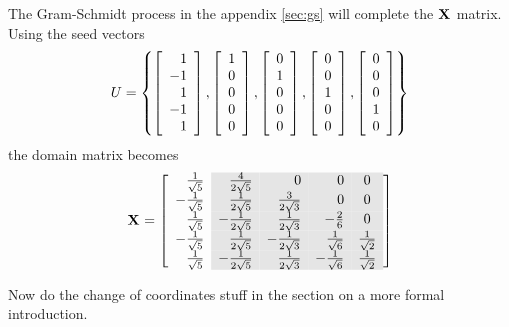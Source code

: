 The Gram-Schmidt process in the appendix \eqref{sec:gs} will complete the $\X{}$ matrix. Using the seed vectors
\begin{equation}
  U = \lst{
  \mat{r}{1 \\ -1 \\  1 \\ -1 \\  1},
  \mat{c}{1\\0\\0\\0\\0},
  \mat{c}{0\\1\\0\\0\\0},
  \mat{c}{0\\0\\1\\0\\0},
  \mat{c}{0\\0\\0\\1\\0}
  }
\end{equation}
the domain matrix becomes
\begin{equation}
  \X{} = 
  \left[
\begin{array}{ r >{\columncolor{ltgray}}r >{\columncolor{ltgray}}r >{\columncolor{ltgray}}r >{\columncolor{ltgray}}c }
  \sfive &  \frac{4}{2\sqrt{5}} &  0 &  0 &  0 \\
 -\sfive &  \frac{1}{2\sqrt{5}} &  \frac{3}{2\sqrt{3}} &  0 &  0\\
  \sfive & -\frac{1}{2\sqrt{5}} &  \frac{1}{2\sqrt{3}} & -\frac{2}{6} &  0\\
 -\sfive &  \frac{1}{2\sqrt{5}} & -\frac{1}{2\sqrt{3}} &  \ssix & \stwo\\
  \sfive & -\frac{1}{2\sqrt{5}} &  \frac{1}{2\sqrt{3}} & -\ssix & \stwo\\
\end{array}
\right]
\end{equation}

Now do the change of coordinates stuff in the section on a more formal introduction.
 
